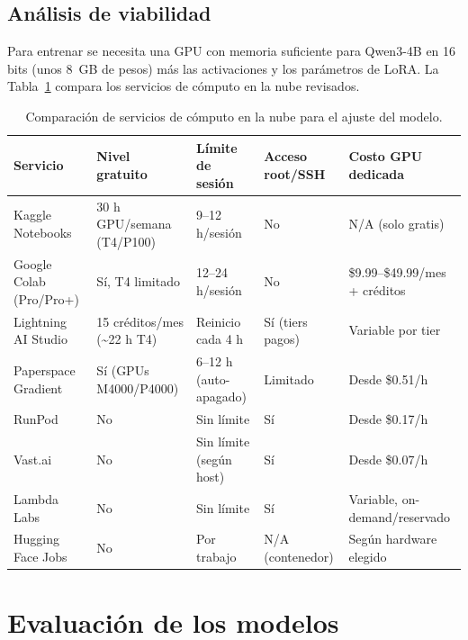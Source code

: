 \subsection{Análisis de viabilidad}
\label{sec:viabilidad}

Para entrenar se necesita una GPU con memoria suficiente para Qwen3-4B en 16 bits (unos 8~GB de pesos) más las activaciones y los parámetros de LoRA. La Tabla~\ref{tab:cloud-services} compara los servicios de cómputo en la nube revisados.
\clearpage

\begin{table}[H]
\centering
\caption{Comparación de servicios de cómputo en la nube para el ajuste del modelo.}
\label{tab:cloud-services}
\small
\begin{tabularx}{\textwidth}{@{}X X X X X@{}}
\toprule
\textbf{Servicio} & \textbf{Nivel gratuito} & \textbf{Límite de sesión} & \textbf{Acceso root/SSH} & \textbf{Costo GPU dedicada} \\
\midrule
Kaggle Notebooks       & 30 h GPU/semana (T4/P100) & 9--12 h/sesión & No & N/A (solo gratis) \\
Google Colab (Pro/Pro+)& Sí, T4 limitado           & 12--24 h/sesión & No & \$9.99--\$49.99/mes + créditos \\
Lightning AI Studio    & 15 créditos/mes (\textasciitilde22 h T4) & Reinicio cada 4 h & Sí (tiers pagos) & Variable por tier \\
Paperspace Gradient    & Sí (GPUs M4000/P4000)     & 6--12 h (auto-apagado) & Limitado & Desde \$0.51/h \\
RunPod                 & No                        & Sin límite & Sí & Desde \$0.17/h \\
Vast.ai                & No                        & Sin límite (según host) & Sí & Desde \$0.07/h \\
Lambda Labs            & No                        & Sin límite & Sí & Variable, on-demand/reservado \\
Hugging Face Jobs      & No                        & Por trabajo & N/A (contenedor) & Según hardware elegido \\
\bottomrule
\end{tabularx}
\end{table}

\clearpage
\section{Evaluación de los modelos}
\label{sec:evaluacion}

